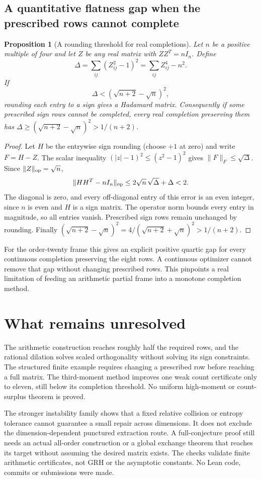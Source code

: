 \documentclass[11pt]{article}
\newtheorem{proposition}[theorem]{Proposition}
\begin{document}
\subsection{A quantitative flatness gap when the prescribed rows cannot complete}
\begin{proposition}[A rounding threshold for real completions]
\label{dil:flatness-gap}
Let $n$ be a positive multiple of four and let $Z$ be any real matrix
with $ZZ^T=nI_n$. Define
\[
 \Delta=\sum_{ij}(Z_{ij}^2-1)^2=\sum_{ij}Z_{ij}^4-n^2.
\]
If
\[
 \Delta<(\sqrt{n+2}-\sqrt n)^2,
\]
rounding each entry to a sign gives a Hadamard matrix.
Consequently if some prescribed sign rows cannot be completed,
every real completion preserving them has
$\Delta\ge(\sqrt{n+2}-\sqrt n)^2>1/(n+2)$.
\end{proposition}
\begin{proof}
Let $H$ be the entrywise sign rounding (choose $+1$ at zero)
and write $F=H-Z$. The scalar inequality
$(|z|-1)^2\le(z^2-1)^2$ gives $\|F\|_F\le\sqrt\Delta$.
Since $\|Z\|_{\rm op}=\sqrt n$,
\[
 \|HH^T-nI_n\|_{\rm op}
 \le2\sqrt n\,\sqrt\Delta+\Delta<2.
\]
The diagonal is zero, and every off-diagonal entry of this error
is an even integer, since $n$ is even and $H$ is a sign matrix.
The operator norm bounds every entry in magnitude, so all entries
vanish. Prescribed sign rows remain unchanged by rounding.
Finally
$(\sqrt{n+2}-\sqrt n)^2
=4/(\sqrt{n+2}+\sqrt n)^2>1/(n+2)$.
\end{proof}

For the order-twenty frame this gives an explicit positive quartic
gap for every continuous completion preserving the eight rows.
A continuous optimizer cannot remove that gap without changing
prescribed rows. This pinpoints a real limitation of feeding an
arithmetic partial frame into a monotone completion method.

\section{What remains unresolved}
The arithmetic construction reaches roughly half the required rows,
and the rational dilation solves scaled orthogonality without solving
its sign constraints. The structured finite example requires changing
a prescribed row before reaching a full matrix.
The third-moment method improves one weak count certificate only to
eleven, still below its completion threshold. No uniform high-moment
or count-surplus theorem is proved.

The stronger instability family shows that a fixed relative
collision or entropy tolerance cannot guarantee a small repair across
dimensions. It does not exclude the dimension-dependent punctured
extraction route. A full-conjecture proof still needs an actual
all-order construction or a global exchange theorem that reaches its
target without assuming the desired matrix exists.
The checks validate finite arithmetic certificates, not GRH or the
asymptotic constants. No Lean code, commits or submissions were made.
\end{document}
